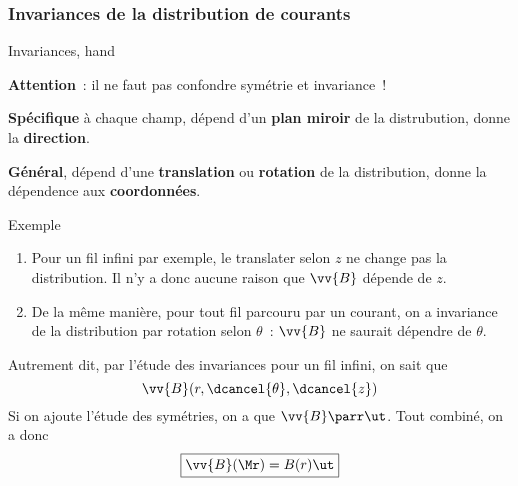 \documentclass[../main/main.tex]{subfiles}
\begin{document}
\subsubsection{Invariances de la distribution de courants}
\label{sssec:invdist}
\begin{tror}{Invariances, hand}
	\begin{center}
		\vspace{12pt}
		\smallbreak
		\textbf{Attention}~: il ne faut pas confondre symétrie et invariance~!
	\end{center}
	\begin{minipage}[]{.45\linewidth}
		\begin{center}
		\end{center}
		\textbf{Spécifique} à chaque champ, dépend d'un \textbf{plan miroir} de la
		distrubution, donne la \textbf{direction}.
	\end{minipage}
	\hfill
	\begin{minipage}[]{.45\linewidth}
		\begin{center}
		\end{center}
		\textbf{Général}, dépend d'une \textbf{translation} ou \textbf{rotation} de
		la distribution, donne la dépendence aux \textbf{coordonnées}.
	\end{minipage}
\end{tror}

\begin{rexem}{Exemple}
	\begin{enumerate}
		\item Pour un fil infini par exemple, le translater selon $z$ ne change pas
		      la distribution. Il n'y a donc aucune raison que $\vv{B}$ dépende de $z$.
		\item De la même manière, pour tout fil parcouru par un courant, on a
		      invariance de la distribution par rotation selon $\theta$~: $\vv{B}$ ne
		      saurait dépendre de $\theta$.
	\end{enumerate}
	Autrement dit, par l'étude des invariances pour un fil infini, on
	sait que
	\[
		\vv{B}(r,\dcancel{\theta},\dcancel{z})
	\]
	Si on ajoute l'étude des symétries, on a que $\vv{B}\parr \ut$. Tout combiné,
	on a donc
	\[
		\boxed{\vv{B}(\Mr) = B(r)\ut}
	\]
\end{rexem}
\end{document}
